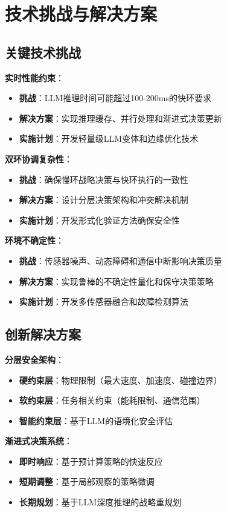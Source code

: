 \section{技术挑战与解决方案}

\subsection{关键技术挑战}

\textbf{实时性能约束}：
\begin{itemize}
\item \textbf{挑战}：LLM推理时间可能超过100-200ms的快环要求
\item \textbf{解决方案}：实现推理缓存、并行处理和渐进式决策更新
\item \textbf{实施计划}：开发轻量级LLM变体和边缘优化技术
\end{itemize}

\textbf{双环协调复杂性}：
\begin{itemize}
\item \textbf{挑战}：确保慢环战略决策与快环执行的一致性
\item \textbf{解决方案}：设计分层决策架构和冲突解决机制
\item \textbf{实施计划}：开发形式化验证方法确保安全性
\end{itemize}

\textbf{环境不确定性}：
\begin{itemize}
\item \textbf{挑战}：传感器噪声、动态障碍和通信中断影响决策质量
\item \textbf{解决方案}：实现鲁棒的不确定性量化和保守决策策略
\item \textbf{实施计划}：开发多传感器融合和故障检测算法
\end{itemize}

\subsection{创新解决方案}

\textbf{分层安全架构}：
\begin{itemize}
\item \textbf{硬约束层}：物理限制（最大速度、加速度、碰撞边界）
\item \textbf{软约束层}：任务相关约束（能耗限制、通信范围）
\item \textbf{智能约束层}：基于LLM的语境化安全评估
\end{itemize}

\textbf{渐进式决策系统}：
\begin{itemize}
\item \textbf{即时响应}：基于预计算策略的快速反应
\item \textbf{短期调整}：基于局部观察的策略微调
\item \textbf{长期规划}：基于LLM深度推理的战略重规划
\end{itemize}

